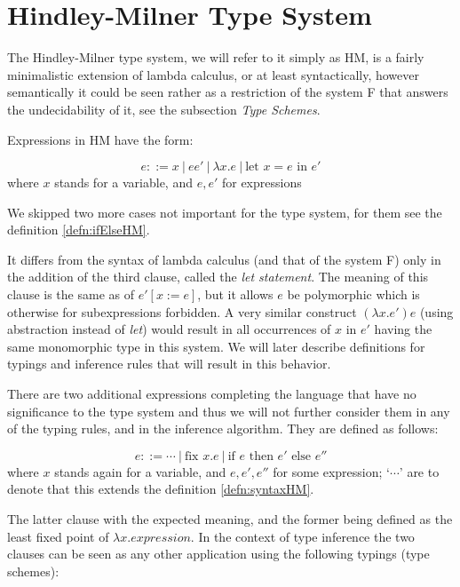 \section{Hindley-Milner Type System}

The Hindley-Milner type system, we will refer to it simply as HM, is a fairly minimalistic extension of lambda calculus, or at least syntactically, however semantically it could be seen rather as a restriction of the system F that answers the undecidability of it, see the subsection \emph{Type Schemes}.

Expressions in HM have the form:

\begin{defn}[HM expressions]
    \label{defn:syntaxHM}
    $$e ::= x\ |\ e e'\ |\ \lambda x . e\ |\ \text{let } x = e \text{ in } e'$$
    where $x$ stands for a variable, and $e, e'$ for expressions
\end{defn}

We skipped two more cases not important for the type system, for them see the definition \ref{defn:ifElseHM}.

It differs from the syntax of lambda calculus (and that of the system F) only in the addition of the third clause, called the \emph{let statement}. The meaning of this clause is the same as of $e' [x := e]$, but it allows $e$ be polymorphic which is otherwise for subexpressions forbidden. A very similar construct $(\lambda x . e') e$ (using abstraction instead of \emph{let}) would result in all occurrences of $x$ in $e'$ having the same monomorphic type in this system. We will later describe definitions for typings and inference rules that will result in this behavior.

There are two additional expressions completing the language that have no significance to the type system and thus we will not further consider them in any of the typing rules, and in the inference algorithm. They are defined as follows:

\begin{defn}
    \label{defn:ifElseHM}
    $$e ::= \cdots\ |\ \text{fix } x . e\ |\ \text{if } e \text{ then } e' \text{ else } e''$$
    where $x$ stands again for a variable, and $e, e', e''$ for some expression; `$\cdots$' are to denote that this extends the definition \ref{defn:syntaxHM}.
\end{defn}

The latter clause with the expected meaning, and the former being defined as the least fixed point of $\lambda x . expression$. In the context of type inference the two clauses can be seen as any other application using the following typings (type schemes):

